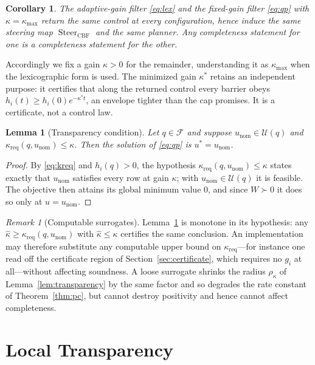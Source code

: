 \documentclass[11pt]{article}
\newtheorem{lemma}{Lemma}
\newtheorem{corollary}{Corollary}
\theoremstyle{remark}
\newtheorem{remark}{Remark}
\newcommand{\F}{\mathcal{F}}
\newcommand{\U}{\mathcal{U}}
\newcommand{\Steer}{\operatorname{Steer}_{\mathrm{CBF}}}
\newcommand{\kreq}{\kappa_{\mathrm{req}}}
\newcommand{\unom}{u_{\mathrm{nom}}}
\newcommand{\kmax}{\kappa_{\max}}
\begin{document}
\begin{corollary}
\label{cor:same-planner}
The adaptive-gain filter \eqref{eq:lex} and the fixed-gain filter \eqref{eq:qp} with
$\kappa=\kmax$ return the same control at every configuration, hence induce the same
steering map $\Steer$ and the same planner. Any completeness statement for one is a
completeness statement for the other.
\end{corollary}

Accordingly we fix a gain $\kappa>0$ for the remainder, understanding it as $\kmax$ when
the lexicographic form is used. The minimized gain $\kappa^\ast$ retains an independent
purpose: it certifies that along the returned control every barrier obeys
$h_i(t)\ge h_i(0)e^{-\kappa^\ast t}$, an envelope tighter than the cap promises. It is a
certificate, not a control law.

\begin{lemma}[Transparency condition]
\label{lem:transparency-cond}
Let $q\in\F$ and suppose $\unom\in\U(q)$ and $\kreq(q,\unom)\le\kappa$. Then the solution
of \eqref{eq:qp} is $u^\ast=\unom$.
\end{lemma}

\begin{proof}
By \eqref{eq:kreq} and $h_i(q)>0$, the hypothesis $\kreq(q,\unom)\le\kappa$ states exactly
that $\unom$ satisfies every row at gain $\kappa$; with $\unom\in\U(q)$ it is feasible. The
objective then attains its global minimum value $0$, and since $W\succ0$ it does so only at
$u=\unom$.
\end{proof}

\begin{remark}[Computable surrogates]
\label{rem:surrogate}
Lemma~\ref{lem:transparency-cond} is monotone in its hypothesis: any
$\widehat\kappa\ge\kreq(q,\unom)$ with $\widehat\kappa\le\kappa$ certifies the same
conclusion. An implementation may therefore substitute any computable upper bound on
$\kreq$---for instance one read off the certificate region of
Section~\ref{sec:certificate}, which requires no $g_i$ at all---without affecting
soundness. A loose surrogate shrinks the radius $\rho_\kappa$ of Lemma~\ref{lem:transparency}
by the same factor and so degrades the rate constant of Theorem~\ref{thm:pc}, but cannot
destroy positivity and hence cannot affect completeness.
\end{remark}

\section{Local Transparency}
\label{sec:local}
\end{document}
